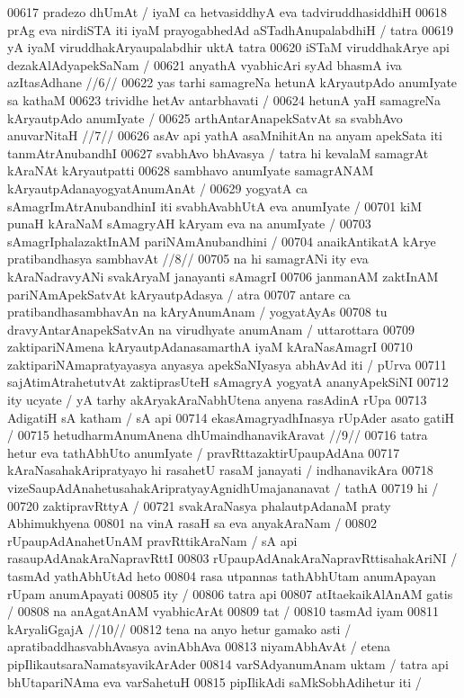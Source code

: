 00617 pradezo dhUmAt / iyaM ca hetvasiddhyA eva tadviruddhasiddhiH  
00618 prAg eva nirdiSTA iti iyaM prayogabhedAd aSTadhAnupalabdhiH / tatra
00619 yA iyaM viruddhakAryaupalabdhir uktA tatra
00620 	iSTaM viruddhakArye api dezakAlAdyapekSaNam / 
00621 	anyathA vyabhicAri syAd bhasmA iva azItasAdhane //6//  
00622 yas tarhi samagreNa hetunA kAryautpAdo anumIyate sa kathaM  
00623 trividhe hetAv antarbhavati /  
00624 	hetunA yaH samagreNa kAryautpAdo anumIyate /  
00625 	arthAntarAnapekSatvAt sa svabhAvo anuvarNitaH //7//
00626 asAv api yathA asaMnihitAn na anyam apekSata iti tanmAtrAnubandhI 
00627 svabhAvo bhAvasya / tatra hi kevalaM samagrAt kAraNAt  kAryautpatti
00628 sambhavo anumIyate samagrANAM kAryautpAdanayogyatAnumAnAt /
00629 yogyatA ca sAmagrImAtrAnubandhinI iti svabhAvabhUtA eva anumIyate /
00701 kiM punaH kAraNaM sAmagryAH kAryam eva na anumIyate / 
00703 	sAmagrIphalazaktInAM pariNAmAnubandhini / 
00704 	anaikAntikatA kArye pratibandhasya sambhavAt //8//
00705 na hi samagrANi ity eva kAraNadravyANi svakAryaM janayanti sAmagrI
00706 janmanAM zaktInAM pariNAmApekSatvAt kAryautpAdasya / atra 
00707 antare ca pratibandhasambhavAn na kAryAnumAnam / yogyatAyAs 
00708 tu dravyAntarAnapekSatvAn na virudhyate anumAnam / uttarottara  
00709 zaktipariNAmena kAryautpAdanasamarthA iyaM kAraNasAmagrI 
00710 zaktipariNAmapratyayasya anyasya apekSaNIyasya abhAvAd iti / pUrva
00711 sajAtimAtrahetutvAt zaktiprasUteH sAmagryA yogyatA ananyApekSiNI
00712 ity ucyate / yA tarhy akAryakAraNabhUtena anyena rasAdinA rUpa  
00713 AdigatiH sA katham / sA api 
00714 	ekasAmagryadhInasya rUpAder asato gatiH /  
00715 	hetudharmAnumAnena dhUmaindhanavikAravat //9//  
00716 tatra hetur eva tathAbhUto anumIyate / pravRttazaktirUpaupAdAna 
00717 kAraNasahakAripratyayo hi rasahetU rasaM janayati / indhanavikAra
00718 vizeSaupAdAnahetusahakAripratyayAgnidhUmajananavat / tathA  
00719 hi / 
00720 	zaktipravRttyA /  
00721 svakAraNasya phalautpAdanaM praty Abhimukhyena  
00801 	na vinA rasaH sa eva anyakAraNam /  
00802 rUpaupAdAnahetUnAM pravRttikAraNam / sA api rasaupAdAnakAraNapravRttI
00803 rUpaupAdAnakAraNapravRttisahakAriNI / tasmAd yathAbhUtAd heto
00804 rasa utpannas tathAbhUtam anumApayan rUpam anumApayati
00805 	ity /
00806 tatra api  
00807 	atItaekaikAlAnAM gatis /
00808 na anAgatAnAM vyabhicArAt  
00809 	tat /
00810 tasmAd iyam  
00811 	kAryaliGgajA //10//  
00812 tena na anyo hetur gamako asti / apratibaddhasvabhAvasya avinAbhAva  
00813 niyamAbhAvAt / etena pipIlikautsaraNamatsyavikArAder 
00814 varSAdyanumAnam uktam / tatra api bhUtapariNAma eva  varSahetuH  
00815 pipIlikAdi saMkSobhAdihetur iti /
